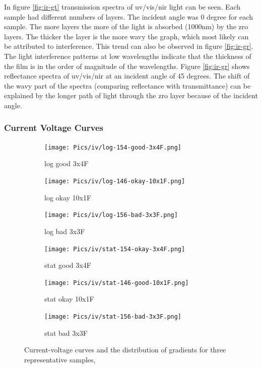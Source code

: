 In figure \ref{fig:ir-gt} transmission spectra of \gls{uv}/\gls{vis}/\gls{nir} light can be seen. 
Each sample had different numbers of layers. 
The incident angle was 0 degree for each sample.
The more layers the more of the light is absorbed (1000nm) by the \gls{zro} layers. 
The thicker the layer is the more wavy the graph, which most likely can be attributed to interference.
This trend can also be observed in figure \ref{fig:ir-gr}.
The light interference patterns at low wavelengths indicate that the thickness of the film is in the order of magnitude of the wavelengths\cite{delimafilho2017film}. 
Figure \ref{fig:ir-gr} shows reflectance spectra of \gls{uv}/\gls{vis}/\gls{nir} at an incident angle of 45 degrees. 
The shift of the wavy part of the spectra (comparing reflectance with transmittance) 
can be explained by the longer path of light through the \gls{zro} layer because of the incident angle. 

\subsubsection{Current Voltage Curves} 
\begin{figure}
    \centering
    \begin{subfigure}{.3\textwidth}
        \texttt{[image: Pics/iv/log-154-good-3x4F.png]}
        \caption{log good 3x4F} \label{fig:iv-log-good}
    \end{subfigure}
    \begin{subfigure}{.3\textwidth}
        \texttt{[image: Pics/iv/log-146-okay-10x1F.png]}
        \caption{log okay 10x1F} \label{fig:iv-log-okay}
    \end{subfigure}
    \begin{subfigure}{.3\textwidth}
        \texttt{[image: Pics/iv/log-156-bad-3x3F.png]}
        \caption{log bad 3x3F} \label{fig:iv-log-bad}
    \end{subfigure}
    \begin{subfigure}{.3\textwidth}
        \texttt{[image: Pics/iv/stat-154-okay-3x4F.png]}
        \caption{stat good 3x4F} \label{fig:iv-stat-good}
    \end{subfigure}
    \begin{subfigure}{.3\textwidth}
        \texttt{[image: Pics/iv/stat-146-good-10x1F.png]}
        \caption{stat okay 10x1F} \label{fig:iv-stat-okay}
    \end{subfigure}
    \begin{subfigure}{.3\textwidth}
        \texttt{[image: Pics/iv/stat-156-bad-3x3F.png]}
        \caption{stat bad 3x3F} \label{fig:iv-stat-bad}
    \end{subfigure}
    \caption{Current-voltage curves and the distribution of gradients for three representative samples, }  
    \label{fig:iv}
\end{figure}

